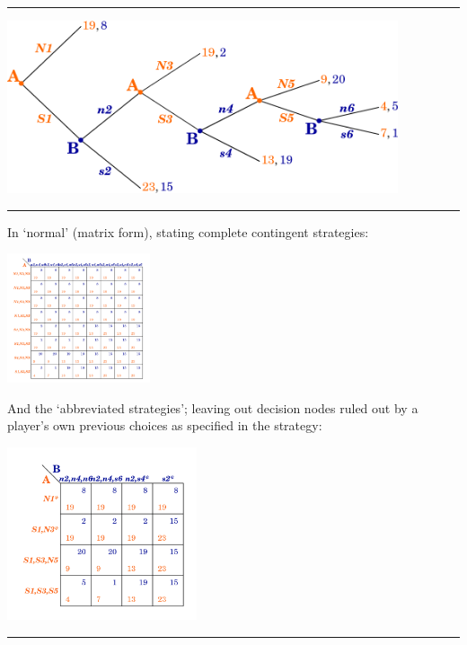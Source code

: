 \documentclass[]{article}
\begin{document}
\begin{center}\rule{0.5\linewidth}{\linethickness}\end{center}

\includegraphics[height=2in]{picsfigs/longgamework_randompayoffs_ul.png}

\begin{center}\rule{0.5\linewidth}{\linethickness}\end{center}

In `normal' (matrix form), stating complete contingent strategies:

\includegraphics[height=1.5in]{picsfigs/longgame_matrix_full.png}

\bigskip

And the `abbreviated strategies'; leaving out decision nodes ruled out by a player's own previous choices as specified in the strategy:

\includegraphics[height=2in]{picsfigs/longgame_matrix_abbrev.png}

\begin{center}\rule{0.5\linewidth}{\linethickness}\end{center}
\end{document}
